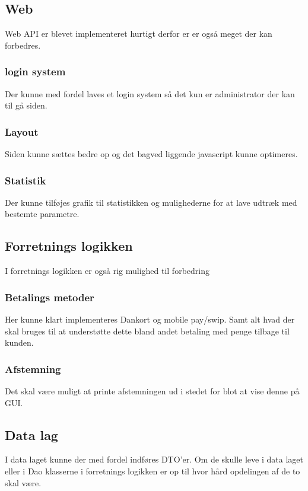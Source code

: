 \subsection{Web}
Web \gls{API} er blevet implementeret hurtigt derfor er er også meget der kan forbedres.

\subsubsection{login system}
Der kunne med fordel laves et login system så det kun er administrator der kan til gå siden.

\subsubsection{Layout}
Siden kunne sættes bedre op og det bagved liggende javascript kunne optimeres.

\subsubsection{Statistik}
Der kunne tilføjes grafik til statistikken og mulighederne for at lave udtræk med bestemte parametre.

\subsection{Forretnings logikken}
I forretnings logikken er også rig mulighed til forbedring

\subsubsection{Betalings metoder}
Her kunne klart implementeres Dankort og mobile pay/swip. 
Samt alt hvad der skal bruges til at understøtte dette bland andet betaling med penge tilbage til kunden.

\subsubsection{Afstemning}
Det skal være muligt at printe afstemningen ud i stedet for blot at vise denne på \gls{GUI}. 

\subsection{Data lag}
I data laget kunne der med fordel indføres \gls{DTO}'er. Om de skulle leve i data laget eller i \gls{Dao} klasserne i forretnings logikken er op til hvor hård opdelingen af de to skal være.